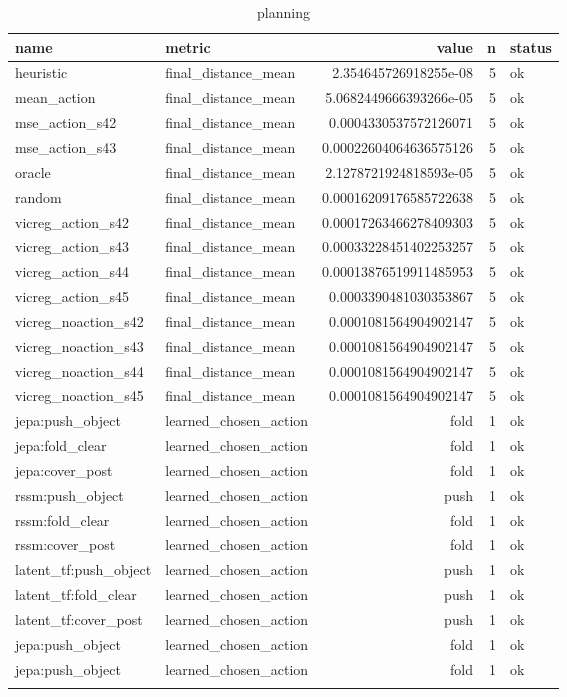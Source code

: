 \begin{table}
\centering
\begin{tabular}{llrrl}
name & metric & value & n & status \\
\hline
heuristic & final\_distance\_mean & 2.354645726918255e-08 & 5 & ok \\
mean\_action & final\_distance\_mean & 5.0682449666393266e-05 & 5 & ok \\
mse\_action\_s42 & final\_distance\_mean & 0.0004330537572126071 & 5 & ok \\
mse\_action\_s43 & final\_distance\_mean & 0.00022604064636575126 & 5 & ok \\
oracle & final\_distance\_mean & 2.1278721924818593e-05 & 5 & ok \\
random & final\_distance\_mean & 0.00016209176585722638 & 5 & ok \\
vicreg\_action\_s42 & final\_distance\_mean & 0.00017263466278409303 & 5 & ok \\
vicreg\_action\_s43 & final\_distance\_mean & 0.00033228451402253257 & 5 & ok \\
vicreg\_action\_s44 & final\_distance\_mean & 0.00013876519911485953 & 5 & ok \\
vicreg\_action\_s45 & final\_distance\_mean & 0.0003390481030353867 & 5 & ok \\
vicreg\_noaction\_s42 & final\_distance\_mean & 0.0001081564904902147 & 5 & ok \\
vicreg\_noaction\_s43 & final\_distance\_mean & 0.0001081564904902147 & 5 & ok \\
vicreg\_noaction\_s44 & final\_distance\_mean & 0.0001081564904902147 & 5 & ok \\
vicreg\_noaction\_s45 & final\_distance\_mean & 0.0001081564904902147 & 5 & ok \\
jepa:push\_object & learned\_chosen\_action & fold & 1 & ok \\
jepa:fold\_clear & learned\_chosen\_action & fold & 1 & ok \\
jepa:cover\_post & learned\_chosen\_action & fold & 1 & ok \\
rssm:push\_object & learned\_chosen\_action & push & 1 & ok \\
rssm:fold\_clear & learned\_chosen\_action & fold & 1 & ok \\
rssm:cover\_post & learned\_chosen\_action & fold & 1 & ok \\
latent\_tf:push\_object & learned\_chosen\_action & push & 1 & ok \\
latent\_tf:fold\_clear & learned\_chosen\_action & push & 1 & ok \\
latent\_tf:cover\_post & learned\_chosen\_action & push & 1 & ok \\
jepa:push\_object & learned\_chosen\_action & fold & 1 & ok \\
jepa:push\_object & learned\_chosen\_action & fold & 1 & ok \\
\caption{planning}
\end{tabular}
\end{table}
